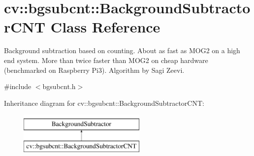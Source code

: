 \hypertarget{classcv_1_1bgsubcnt_1_1BackgroundSubtractorCNT}{}\section{cv\+:\+:bgsubcnt\+:\+:Background\+Subtractor\+C\+NT Class Reference}
\label{classcv_1_1bgsubcnt_1_1BackgroundSubtractorCNT}


Background subtraction based on counting. About as fast as M\+O\+G2 on a high end system. More than twice faster than M\+O\+G2 on cheap hardware (benchmarked on Raspberry Pi3). Algorithm by Sagi Zeevi.  




{\ttfamily \#include $<$bgsubcnt.\+h$>$}

Inheritance diagram for cv\+:\+:bgsubcnt\+:\+:Background\+Subtractor\+C\+NT\+:\begin{figure}[H]
\begin{center}
\leavevmode
\includegraphics[height=2.000000cm]{classcv_1_1bgsubcnt_1_1BackgroundSubtractorCNT}
\end{center}
\end{figure}
